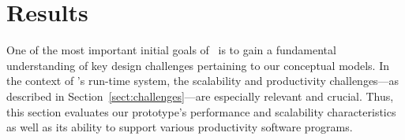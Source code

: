 \section{Results}
\label{sec:results}
One of the most important initial goals of \flux\ is to gain
a fundamental understanding of key design challenges pertaining
to our conceptual models.
In the context of \flux's run-time system, the scalability
and productivity
challenges---as described in Section~\ref{sect:challenges}---are especially
relevant and crucial. 
Thus, this section evaluates our prototype's performance
and scalability characteristics as well as its ability
to support various productivity software programs. 




